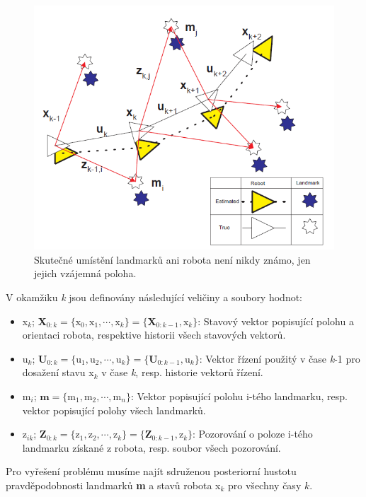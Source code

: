 \documentclass[12pt,a4paper]{article}
\begin{document}
\begin{figure}[H]
\centering
\includegraphics[scale=0.6]{Obr2}
\caption{Skutečné umístění landmarků ani robota není nikdy známo, jen jejich vzájemná poloha.}
\end{figure}

V okamžiku \textit{k} jsou definovány následující veličiny a soubory hodnot:
\begin{itemize}
\item x$_k$; \textbf{X}$_{0:k}=\lbrace \text{x}_0, \text{x}_1,\cdots, \text{x}_k\rbrace = \lbrace \textbf{X}_{0:k-1}, \text{x}_k \rbrace$:  
Stavový vektor popisující polohu a orientaci robota, respektive  historii všech stavových vektorů.
\item u$_k$; \textbf{U}$_{0:k}=\lbrace \text{u}_1, \text{u}_2,\cdots, \text{u}_k\rbrace = \lbrace \textbf{U}_{0:k-1}, \text{u}_k \rbrace$: 
Vektor řízení použitý v čase \textit{k}-1 pro dosažení stavu x$_k$ v čase \textit{k}, resp. historie vektorů řízení.
\item m$_i$; $\textbf{m}=\lbrace \text{m}_1, \text{m}_2,\cdots, \text{m}_n\rbrace$: 
Vektor popisující polohu i-tého landmarku, resp. vektor popisující polohy všech landmarků.
\item z$_{ik}$; \textbf{Z}$_{0:k}=\lbrace \text{z}_1, \text{z}_2,\cdots, \text{z}_k\rbrace = \lbrace \textbf{Z}_{0:k-1}, \text{z}_k \rbrace$: 
Pozorování o poloze i-tého landmarku získané z robota, resp. soubor všech pozorování.
\end{itemize}

Pro vyřešení problému musíme najít sdruženou posteriorní hustotu pravděpodobnosti landmarků \textbf{m} a stavů robota x$_k$ pro všechny časy $k$.
\end{document}
